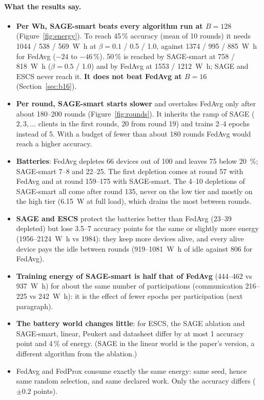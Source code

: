 \documentclass[11pt,a4paper]{article}
\begin{document}
\paragraph{What the results say.}
\begin{itemize}
  \item \textbf{Per Wh, SAGE-smart beats every algorithm run at $B=128$}
        (Figure~\ref{fig:energy}). To reach 45\,\% accuracy (mean of 10
        rounds) it needs 1044 / 538 / \SI{569}{\watt\hour} at $\beta=0.1$ /
        0.5 / 1.0, against 1374 / 995 / \SI{885}{\watt\hour} for FedAvg
        ($-24$ to $-46\,\%$). 50\,\% is reached by SAGE-smart at 758 / \SI{818}{\watt\hour}
        ($\beta=0.5$ / 1.0) and by FedAvg at 1553 / \SI{1212}{\watt\hour}; SAGE
        and ESCS never reach it. \textbf{It does not beat FedAvg at $B=16$}
        (Section~\ref{sec:b16}).
  \item \textbf{Per round, SAGE-smart starts slower} and overtakes FedAvg only
        after about 180--200 rounds (Figure~\ref{fig:rounds}). It inherits the
        ramp of SAGE ($2, 3, \dots$ clients in the first rounds, 20 from round
        19) and trains 2--4 epochs instead of 5. With a budget of fewer than
        about 180 rounds FedAvg would reach a higher accuracy.
  \item \textbf{Batteries}: FedAvg depletes 66 devices out of 100 and leaves 75
        below \SI{20}{\percent}; SAGE-smart 7--8 and 22--25. The first depletion
        comes at round 57 with FedAvg and at round 159--175 with SAGE-smart.
        The 4--10 depletions of SAGE-smart all come after round 135, never on
        the low tier and mostly on the high tier (\SI{6.15}{\watt} at full
        load), which drains the most between rounds.
  \item \textbf{SAGE and ESCS} protect the batteries better than FedAvg (23--39
        depleted) but lose 3.5--7 accuracy points for the same or slightly more
        energy (1956--\SI{2124}{\watt\hour} vs 1984): they keep more devices
        alive, and every alive device pays the idle between rounds
        (\SI{919}{}--\SI{1081}{\watt\hour} of idle against 806 for FedAvg).
  \item \textbf{Training energy of SAGE-smart is half that of FedAvg}
        (444--462 vs \SI{937}{\watt\hour}) for about the same number of
        participations (communication 216--225 vs \SI{242}{\watt\hour}): it is
        the effect of fewer epochs per participation (next paragraph).
  \item \textbf{The battery world changes little}: for ESCS, the SAGE ablation
        and SAGE-smart, linear, Peukert and datasheet differ by at most 1
        accuracy point and 4\,\% of energy. (SAGE in the linear world is the
        paper's version, a different algorithm from the ablation.)
  \item FedAvg and FedProx consume exactly the same energy: same seed, hence
        same random selection, and same declared work. Only the accuracy
        differs ($\pm0.2$ points).
\end{itemize}
\end{document}
